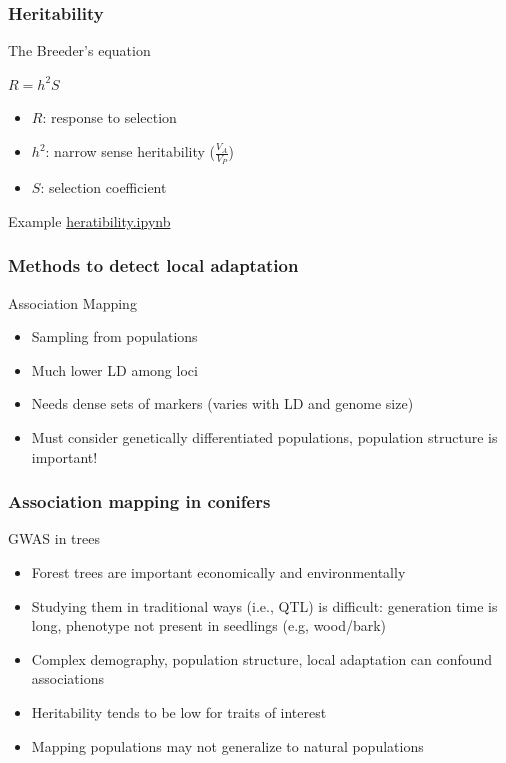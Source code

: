 \begin{frame}
\frametitle{Heritability}
\begin{block}{The Breeder's equation}
\begin{center}
\huge
$R = h^2S$
\end{center}
\begin{itemize}
\item[]{$R$: response to selection}
\item[]{$h^2$: narrow sense heritability ($\frac{V_A}{V_P}$)}
\item[]{$S$: selection coefficient}
\end{itemize}
\end{block}

\begin{block}{Example}
\href{http://localhost:8888/notebooks/heritability.ipynb}{heratibility.ipynb}
\end{block}
\end{frame}






\begin{frame}
\frametitle{Methods to detect local adaptation}
\begin{block}{Association Mapping}
\begin{itemize}
\item{Sampling from populations}
\item{Much lower LD among loci}
\item{Needs dense sets of markers (varies with LD and genome size)}
\item{Must consider genetically differentiated populations, population
structure is important!}
\end{itemize}
\end{block}
\end{frame}

\begin{frame}
\frametitle{Association mapping in conifers}
\begin{block}{GWAS in trees}
\begin{itemize}
\item{Forest trees are important economically and environmentally}
\item{Studying them in traditional ways (i.e., QTL) is difficult: generation
time is long, phenotype not present in seedlings (e.g, wood/bark)}
\item{Complex demography, population structure, local adaptation can confound 
associations}
\item{Heritability tends to be low for traits of interest}
\item{Mapping populations may not generalize to natural populations}
\end{itemize}
\end{block}
\tiny
\citet{Uchiyama:2013ci}
\end{frame}


